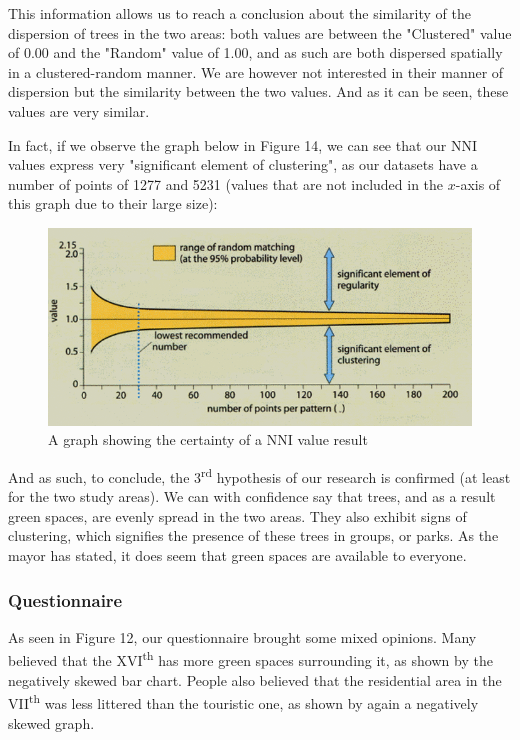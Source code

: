 \documentclass[11pt,letterpaper]{article}
\begin{document}
This information allows us to reach a conclusion about the similarity of the dispersion of trees in the two areas: both values are between the "Clustered" value of 0.00 and the "Random" value of 1.00, and as such are both dispersed spatially in a clustered-random manner. We are however not interested in their manner of dispersion but the similarity between the two values. And as it can be seen, these values are very similar. 

In fact, if we observe the graph below in Figure 14, we can see that our NNI values express very "significant element of clustering", as our datasets have a number of points of 1277 and 5231 (values that are not included in the $x$-axis of this graph due to their large size): 

\begin{figure}[H]
    \centering
    \includegraphics[width=0.7\linewidth]{media/certaintynn.png}
    \caption{A graph showing the certainty of a NNI value result}
\end{figure}

And as such, to conclude, the 3\textsuperscript{rd} hypothesis of our research is confirmed (at least for the two study areas). We can with confidence say that trees, and as a result green spaces, are evenly spread in the two areas. They also exhibit signs of clustering, which signifies the presence of these trees in groups, or parks. As the mayor has stated, it does seem that green spaces are available to everyone.  

\subsubsection{Questionnaire}

As seen in Figure 12, our questionnaire brought some mixed opinions. Many believed that the XVI\textsuperscript{th} has more green spaces surrounding it, as shown by the negatively skewed bar chart. People also believed that the residential area in the VII\textsuperscript{th} was less littered than the touristic one, as shown by again a negatively skewed graph. 
\end{document}
